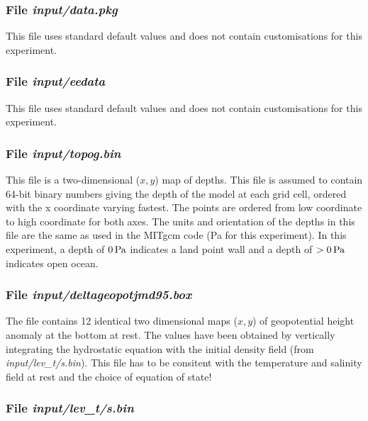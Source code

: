 {\begin{small}

\end{small}

\subsubsection{File {\it input/data.pkg}}
\label{www:tutorials}

This file uses standard default values and does not contain
customisations for this experiment.

\subsubsection{File {\it input/eedata}}
\label{www:tutorials}

This file uses standard default values and does not contain
customisations for this experiment.

\subsubsection{File {\it input/topog.bin}}
\label{www:tutorials}

This file is a two-dimensional ($x,y$) map of
depths. This file is assumed to contain 64-bit binary numbers giving
the depth of the model at each grid cell, ordered with the x
coordinate varying fastest. The points are ordered from low
coordinate to high coordinate for both axes. The units and
orientation of the depths in this file are the same as used in the
MITgcm code (Pa for this experiment). In this experiment, a depth of
$0\mbox{\,Pa}$ indicates a land point wall and a depth of
$>0\mbox{\,Pa}$ indicates open ocean.

\subsubsection{File {\it input/deltageopotjmd95.box}}
\label{www:tutorials}

The file contains 12 identical two dimensional maps ($x,y$) of
geopotential height anomaly at the bottom at rest. The values have
been obtained by vertically integrating the hydrostatic equation with
the initial density field (from {\it input/lev\_t/s.bin}). This file
has to be consitent with the temperature and salinity field at rest
and the choice of equation of state!

\subsubsection{File {\it input/lev\_t/s.bin}}
\label{www:tutorials}

}
